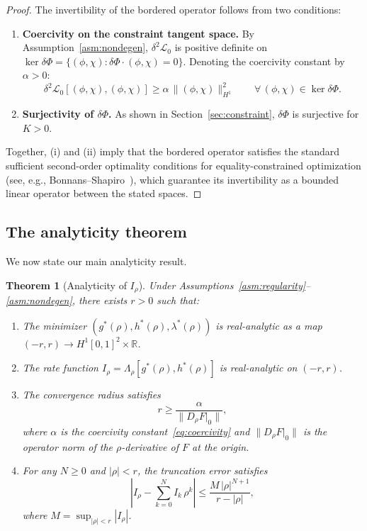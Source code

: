 \documentclass[11pt]{article}
\newtheorem{theorem}{Theorem}
\theoremstyle{definition}
\newcommand{\R}{\mathbb{R}}
\newcommand{\Hone}{H^1}
\begin{document}
\begin{proof}
The invertibility of the bordered operator follows from two conditions:
\begin{enumerate}[label=(\roman*)]
  \item \textbf{Coercivity on the constraint tangent space.} By Assumption~\ref{asm:nondegen}, $\delta^2\mathcal{L}_0$ is positive definite on $\ker\delta\Phi = \{(\phi,\chi) : \delta\Phi\cdot(\phi,\chi) = 0\}$. Denoting the coercivity constant by $\alpha > 0$:
  \begin{equation}\label{eq:coercivity}
    \delta^2\mathcal{L}_0[(\phi,\chi),(\phi,\chi)] \geq \alpha\,\|(\phi,\chi)\|_{\Hone}^2 \qquad \forall\, (\phi,\chi) \in \ker\delta\Phi.
  \end{equation}

  \item \textbf{Surjectivity of $\delta\Phi$.} As shown in Section~\ref{sec:constraint}, $\delta\Phi$ is surjective for $K > 0$.
\end{enumerate}

Together, (i) and (ii) imply that the bordered operator satisfies the standard sufficient second-order optimality conditions for equality-constrained optimization (see, e.g., Bonnans--Shapiro~\cite[Theorem~4.36]{BonnansShapiro}), which guarantee its invertibility as a bounded linear operator between the stated spaces.
\end{proof}

\subsection{The analyticity theorem}

We now state our main analyticity result.

\begin{theorem}[Analyticity of $I_\rho$]\label{thm:analyticity}
Under Assumptions~\ref{asm:regularity}--\ref{asm:nondegen}, there exists $r > 0$ such that:
\begin{enumerate}[label=(\roman*)]
  \item The minimizer $(g^*(\rho), h^*(\rho), \lambda^*(\rho))$ is real-analytic as a map $(-r,r) \to \Hone[0,1]^2 \times \R$.
  \item The rate function $I_\rho = \Lambda_\rho[g^*(\rho), h^*(\rho)]$ is real-analytic on $(-r,r)$.
  \item The convergence radius satisfies
  \begin{equation}\label{eq:r_bound}
    r \geq \frac{\alpha}{\|D_\rho F|_0\|},
  \end{equation}
  where $\alpha$ is the coercivity constant~\eqref{eq:coercivity} and $\|D_\rho F|_0\|$ is the operator norm of the $\rho$-derivative of $F$ at the origin.
  \item For any $N \geq 0$ and $|\rho| < r$, the truncation error satisfies
  \begin{equation}\label{eq:error_bound}
    \left|I_\rho - \sum_{k=0}^N I_k\,\rho^k\right| \leq \frac{M\,|\rho|^{N+1}}{r - |\rho|},
  \end{equation}
  where $M = \sup_{|\rho| < r} |I_\rho|$.
\end{enumerate}
\end{theorem}
\end{document}

